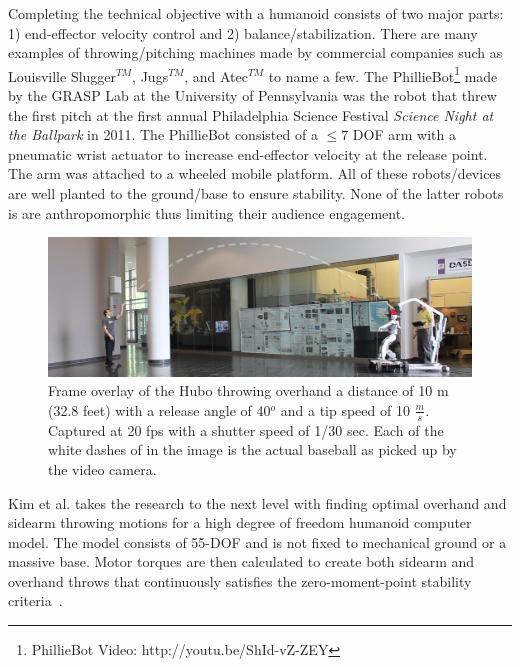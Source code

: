 Completing the technical objective with a humanoid consists of two major parts: 1) end-effector velocity control and 2) balance/stabilization. 
There are many examples of throwing/pitching machines made by commercial companies such as Louisville Slugger$^{TM}$, Jugs$^{TM}$, and Atec$^{TM}$ to name a few.  
The PhillieBot\footnote{PhillieBot Video: http://youtu.be/ShId-vZ-ZEY} made by the GRASP Lab at the University of Pennsylvania was the robot that threw the first pitch at the first annual Philadelphia Science Festival \textit{Science Night at the Ballpark} in 2011.  
The PhillieBot consisted of a $\leq 7$ DOF arm with a pneumatic wrist actuator to increase end-effector velocity at the release point.  
The arm was attached to a wheeled mobile platform.
All of these robots/devices are well planted to the ground/base to ensure stability.
None of the latter robots is are anthropomorphic thus limiting their audience engagement.

\begin{figure}[t]
  \centering
\includegraphics[width=1.0\textwidth]{./pix/preThrow2.png}
  \caption{Frame overlay of the Hubo throwing overhand a distance of 10 m (32.8 feet) with a release angle of 40$^o$ and a tip speed of 10 $\frac{m}{s}$.  Captured at 20 fps with a shutter speed of 1/30 sec.  Each of the white dashes of in the image is the actual baseball as picked up by the video camera.}
  \label{fig:hubo-throw-test}
\end{figure}


Kim et al. \cite{5686315,JooH2011438} takes the research to the next level with finding optimal overhand and sidearm throwing motions for a high degree of freedom humanoid computer model.  
The model consists of 55-DOF and is not fixed to mechanical ground or a massive base.  
Motor torques are then calculated to create both sidearm and overhand throws that continuously satisfies the zero-moment-point stability criteria~\cite{4309277}.  

